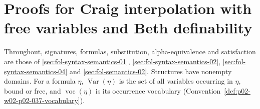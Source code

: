 \section{Proofs for Craig interpolation with free variables and Beth definability}
\label{sec:annex-p02-w02-p02-037-craig-beth}

Throughout, signatures, formulas, substitution, alpha-equivalence and
satisfaction are those of \cref{sec:fol-syntax-semantics-01},
\cref{sec:fol-syntax-semantics-02}, \cref{sec:fol-syntax-semantics-04} and
\cref{sec:fol-semantics-02}.  Structures have nonempty domains.  For a
formula \(\eta\), \(\operatorname{Var}(\eta)\) is the set of all variables
occurring in \(\eta\), bound or free, and \(\operatorname{voc}(\eta)\) is its
occurrence vocabulary (Convention~\ref{def:p02-w02-p02-037-vocabulary}).

